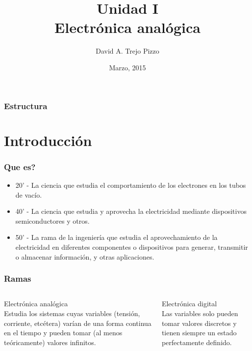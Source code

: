\documentclass{beamer}
\title[Seminario de tecnología]{Unidad I\\ Electrónica analógica}
\author{David A. Trejo Pizzo}
\institute[Instituto Multimedial Da Vinci]
{Departamento de sistemas\\
\medskip
\textit{dtrejopizzo@gmail.com}}
\date{Marzo, 2015}
\begin{document}
\begin{frame}
\titlepage
\end{frame}


\begin{frame}
\frametitle{Estructura}
\tableofcontents
\end{frame}




\section{Introducción}

\begin{frame}
\frametitle{Que es?}

\begin{itemize}
\item 20' - La ciencia que estudia el comportamiento de los electrones en los tubos de vacío.
\item 40' - La ciencia que estudia y aprovecha la electricidad mediante dispositivos semiconductores y otros.
\item 50' - La rama de la ingeniería que estudia el aprovechamiento de la electricidad en diferentes componentes o dispositivos para generar, transmitir o almacenar información, y otras aplicaciones.
\end{itemize}
\end{frame}

\begin{frame}
\frametitle{Ramas}
\begin{columns}[c]

Electrónica analógica\\

Estudia los sistemas cuyas variables (tensión, corriente, etcétera) varían de una forma continua en el tiempo y pueden tomar (al menos teóricamente) valores infinitos.

Electrónica digital\\

Las variables solo pueden tomar valores discretos y tienen siempre un estado perfectamente definido.

\end{columns}
\end{frame}
\end{document}
